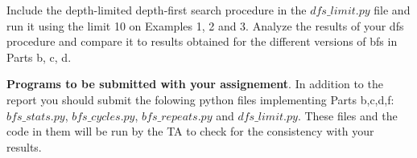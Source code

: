 \documentclass[11pt]{article}
\begin{document}
Include the depth-limited depth-first search procedure in the $dfs\_limit.py$ file and run it using the limit 10 on Examples 1, 2 and 3. Analyze the results of your dfs procedure and compare it to results obtained for the different versions of bfs in Parts b, c, d. 


{\bf Programs to be submitted with your assignement}. 
In addition to the report you should submit the folowing python files implementing Parts b,c,d,f: $bfs\_stats.py$,  $bfs\_cycles.py$, $bfs\_repeats.py$ and $dfs\_limit.py$. These files and the code in them will be run by the TA to check for the consistency with your results. 
\end{document}
